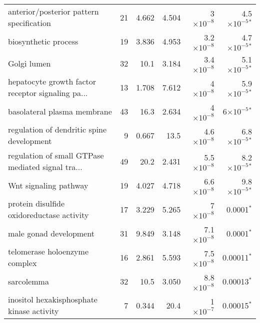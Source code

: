 \begin{longtable}{|l|r|r|r|r|r|}
          anterior/posterior pattern specification &                      21 &                   4.662 &      4.504 &    3$\times 10^{-8}$ &   4.5$\times 10^{-5}$$\bm{^*}$ \\
                              biosynthetic process &                      19 &                   3.836 &      4.953 &  3.2$\times 10^{-8}$ &   4.7$\times 10^{-5}$$\bm{^*}$ \\
                                       Golgi lumen &                      32 &                    10.1 &      3.184 &  3.4$\times 10^{-8}$ &   5.1$\times 10^{-5}$$\bm{^*}$ \\
 hepatocyte growth factor receptor signaling pa... &                      13 &                   1.708 &      7.612 &    4$\times 10^{-8}$ &   5.9$\times 10^{-5}$$\bm{^*}$ \\
                       basolateral plasma membrane &                      43 &                    16.3 &      2.634 &    4$\times 10^{-8}$ &     6$\times 10^{-5}$$\bm{^*}$ \\
         regulation of dendritic spine development &                       9 &                   0.667 &       13.5 &  4.6$\times 10^{-8}$ &   6.8$\times 10^{-5}$$\bm{^*}$ \\
 regulation of small GTPase mediated signal tra... &                      49 &                    20.2 &      2.431 &  5.5$\times 10^{-8}$ &   8.2$\times 10^{-5}$$\bm{^*}$ \\
                             Wnt signaling pathway &                      19 &                   4.027 &      4.718 &  6.6$\times 10^{-8}$ &   9.8$\times 10^{-5}$$\bm{^*}$ \\
         protein disulfide oxidoreductase activity &                      17 &                   3.229 &      5.265 &    7$\times 10^{-8}$ &                0.0001$\bm{^*}$ \\
                            male gonad development &                      31 &                   9.849 &      3.148 &  7.1$\times 10^{-8}$ &                0.0001$\bm{^*}$ \\
                     telomerase holoenzyme complex &                      16 &                   2.861 &      5.593 &  7.5$\times 10^{-8}$ &               0.00011$\bm{^*}$ \\
                                        sarcolemma &                      32 &                    10.5 &      3.050 &  8.8$\times 10^{-8}$ &               0.00013$\bm{^*}$ \\
         inositol hexakisphosphate kinase activity &                       7 &                   0.344 &       20.4 &    1$\times 10^{-7}$ &               0.00015$\bm{^*}$ \\

\end{longtable}
